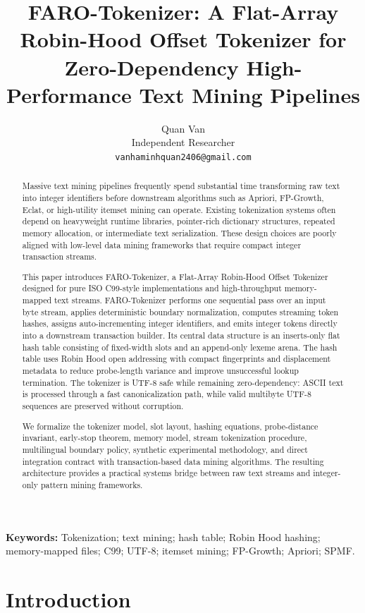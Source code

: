 \documentclass[11pt,a4paper]{article}
\title{\textbf{FARO-Tokenizer: A Flat-Array Robin-Hood Offset Tokenizer for Zero-Dependency High-Performance Text Mining Pipelines}}
\author{
Quan Van\\
Independent Researcher\\
\texttt{vanhaminhquan2406@gmail.com}
}
\date{}
\begin{document}
\maketitle

\begin{abstract}
Massive text mining pipelines frequently spend substantial time transforming raw text into integer identifiers before downstream algorithms such as Apriori, FP-Growth, Eclat, or high-utility itemset mining can operate. Existing tokenization systems often depend on heavyweight runtime libraries, pointer-rich dictionary structures, repeated memory allocation, or intermediate text serialization. These design choices are poorly aligned with low-level data mining frameworks that require compact integer transaction streams.

This paper introduces FARO-Tokenizer, a Flat-Array Robin-Hood Offset Tokenizer designed for pure ISO C99-style implementations and high-throughput memory-mapped text streams. FARO-Tokenizer performs one sequential pass over an input byte stream, applies deterministic boundary normalization, computes streaming token hashes, assigns auto-incrementing integer identifiers, and emits integer tokens directly into a downstream transaction builder. Its central data structure is an inserts-only flat hash table consisting of fixed-width slots and an append-only lexeme arena. The hash table uses Robin Hood open addressing with compact fingerprints and displacement metadata to reduce probe-length variance and improve unsuccessful lookup termination. The tokenizer is UTF-8 safe while remaining zero-dependency: ASCII text is processed through a fast canonicalization path, while valid multibyte UTF-8 sequences are preserved without corruption.

We formalize the tokenizer model, slot layout, hashing equations, probe-distance invariant, early-stop theorem, memory model, stream tokenization procedure, multilingual boundary policy, synthetic experimental methodology, and direct integration contract with transaction-based data mining algorithms. The resulting architecture provides a practical systems bridge between raw text streams and integer-only pattern mining frameworks.
\end{abstract}

\noindent\textbf{Keywords:}
Tokenization; text mining; hash table; Robin Hood hashing; memory-mapped files; C99; UTF-8; itemset mining; FP-Growth; Apriori; SPMF.

\section{Introduction}
\end{document}
